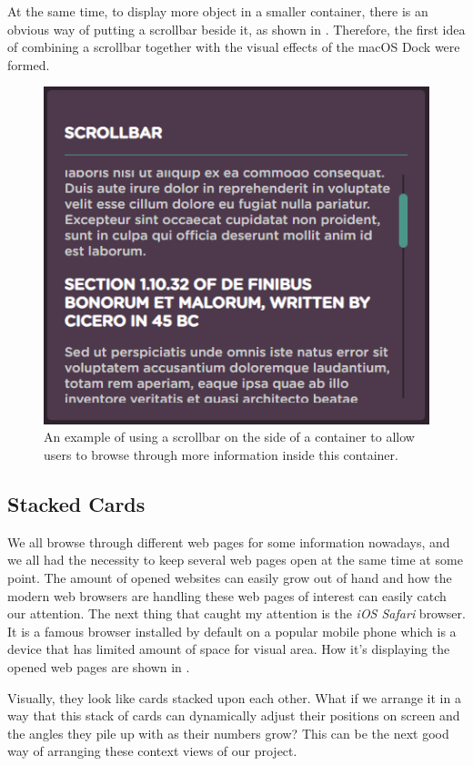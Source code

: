 At the same time, to display more object in a smaller container, there is an obvious way of putting a scrollbar beside it, as shown in . Therefore, the first idea of combining a scrollbar together with the visual effects of the macOS Dock were formed.

\begin{figure}[H]
\centering
\includegraphics[width=.5\textwidth,keepaspectratio]{Figures/Chapter1/scrollbar.png}
\decoRule
\caption[Modern-looking Scrollbar]{An example of using a scrollbar on the side of a container to allow users to browse through more information inside this container.}
\label{fig:scrollbar}
\end{figure}

\subsection{Stacked Cards}

We all browse through different web pages for some information nowadays, and we all had the necessity to keep several web pages open at the same time at some point. The amount of opened websites can easily grow out of hand and how the modern web browsers are handling these web pages of interest can easily catch our attention. The next thing that caught my attention is the \emph{iOS Safari} browser. It is a famous browser installed by default on a popular mobile phone which is a device that has limited amount of space for visual area. How it's displaying the opened web pages are shown in .

Visually, they look like cards stacked upon each other. What if we arrange it in a way that this stack of cards can dynamically adjust their positions on screen and the angles they pile up with as their numbers grow? This can be the next good way of arranging these context views of our project.

